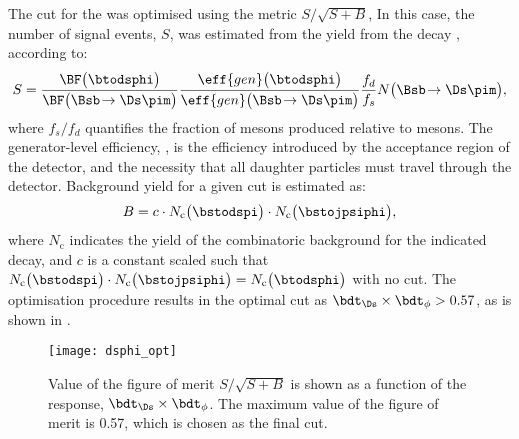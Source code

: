 The cut for the \bdt was optimised using the metric $S/\sqrt{S+B}$,
In this case, the number of signal events, $S$, was estimated from the yield from the decay
\decay{\Bs}{\Dsm\pip}, according to:
\begin{equation}
  S = \frac{ \BF\big(\btodsphi\big) }{ \BF\big(\Bsb\!\to\Ds\pim\big) }
  \frac{ \eff{gen}\big(\btodsphi\big) }{ \eff{gen}\big(\Bsb\!\to\Ds\pim\big) }
  \frac{f_d}{f_s}
  N\big(\Bsb\!\to\Ds\pim\big),
\end{equation}
where $f_s/f_d$ quantifies the fraction of \Bs mesons produced relative to \Bd mesons.
The generator-level efficiency, , is the efficiency introduced by the acceptance region of
the \lhcb detector, and the necessity that all daughter particles must travel through the detector.
Background yield for a given cut is estimated as:
\begin{equation}
  B = c\cdot N_\mathrm{c}\big(\bstodspi\big)\cdot N_\mathrm{c}\big(\bstojpsiphi\big),
\end{equation}
where $N_\mathrm{c}$ indicates the yield of the combinatoric background for the indicated decay,
and $c$ is a constant scaled such that $N_\mathrm{c}\big(\bstodspi\big)\cdot
N_\mathrm{c}\big(\bstojpsiphi\big)=N_\mathrm{c}\big(\btodsphi\big)$ with no \bdt cut.
The optimisation procedure results in the optimal cut as $\bdt_{\Ds}\times\bdt_\phi>0.57$, as is
shown in .


\begin{figure}
  \begin{center}
    \texttt{[image: dsphi\_opt]}
    \caption[Optimisation of BDT cut for selection of \btodsphi candidates]
    {
      Value of the figure of merit $S/\sqrt{S+B}$ is shown as a function of the \bdt response,
      $\bdt_{\Ds}\times\bdt_{\phi}$.
      The maximum value of the figure of merit is 0.57, which is chosen as the final \bdt cut.
    }
    \label{fig:dsphi:opt}
  \end{center}
\end{figure}



